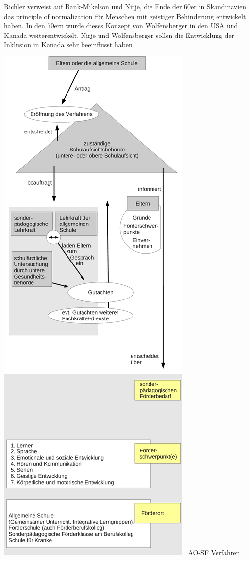 Richler verweist auf Bank-Mikelson und Nirje, die Ende der 60er in Skandinavien das principle of normalization für Menschen mit geistiger Behinderung entwickelt haben. In den 70ern wurde dieses Konzept von Wolfensberger in den USA und Kanada weiterentwickelt. Nirje und Wolfensberger sollen die Entwicklung der Inklusion in Kanada sehr beeinflusst haben.
\begin{center}
\begin{minipage}{\linewidth}
\centering
\includegraphics[scale=0.35]{AO-SF.pdf}
[]{AO-SF Verfahren}%
\end{minipage}
\end{center}
